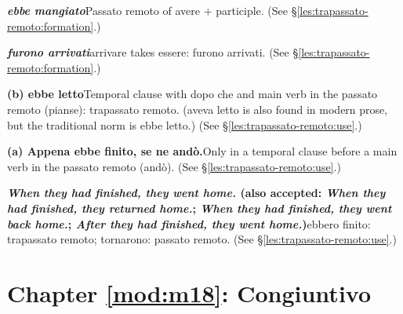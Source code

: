 \documentclass[11pt,a4paper,twoside,openright]{book}
\newcommand{\answerheading}[1]{\par\medskip\noindent{\sffamily\bfseries\small #1}\par\nopagebreak}
\begin{document}
\answerheading{\S\ref{les:trapassato-remoto} Trapassato remoto}\label{ans:trapassato-remoto}
\begin{answers}
\item\relax \textbf{\textit{ebbe mangiato}}\newline Passato remoto of avere + participle. {\color{muted}(See \S\ref{les:trapassato-remoto:formation}.)}
\item\relax \textbf{\textit{furono arrivati}}\newline arrivare takes essere: furono arrivati. {\color{muted}(See \S\ref{les:trapassato-remoto:formation}.)}
\item\relax \textbf{(b) ebbe letto}\newline Temporal clause with dopo che and main verb in the passato remoto (pianse): trapassato remoto. (aveva letto is also found in modern prose, but the traditional norm is ebbe letto.) {\color{muted}(See \S\ref{les:trapassato-remoto:use}.)}
\item\relax \textbf{(a) Appena ebbe finito, se ne andò.}\newline Only in a temporal clause before a main verb in the passato remoto (andò). {\color{muted}(See \S\ref{les:trapassato-remoto:use}.)}
\item\relax \textbf{\textit{When they had finished, they went home.} {\color{muted}(also accepted: \textit{When they had finished, they returned home.}; \textit{When they had finished, they went back home.}; \textit{After they had finished, they went home.})}}\newline ebbero finito: trapassato remoto; tornarono: passato remoto. {\color{muted}(See \S\ref{les:trapassato-remoto:use}.)}
\end{answers}

\section*{Chapter \ref{mod:m18}: Congiuntivo}
\end{document}
